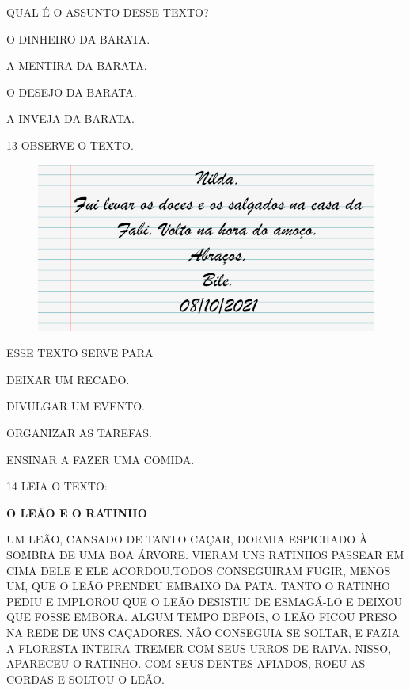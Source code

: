 QUAL É O ASSUNTO DESSE TEXTO?

\begin{multicols}{2}
\begin{escolha}
\item O DINHEIRO DA BARATA.

\item A MENTIRA DA BARATA.

\item O DESEJO DA BARATA.

\item A INVEJA DA BARATA.
\end{escolha}
\end{multicols}

\num{13} OBSERVE O TEXTO.

\begin{figure}[htpb]
\centering
\includegraphics[width=\textwidth]{media/image220.png}
\end{figure}

ESSE TEXTO SERVE PARA

\begin{escolha}
\item DEIXAR UM RECADO.

\item DIVULGAR UM EVENTO.

\item ORGANIZAR AS TAREFAS.

\item ENSINAR A FAZER UMA COMIDA.
\end{escolha}

\num{14} LEIA O TEXTO:

\begin{myquote}
\textbf{O LEÃO E O RATINHO}


UM LEÃO, CANSADO DE TANTO CAÇAR, DORMIA ESPICHADO À SOMBRA
DE UMA BOA ÁRVORE. VIERAM UNS RATINHOS PASSEAR EM CIMA DELE
E ELE ACORDOU.TODOS CONSEGUIRAM FUGIR, MENOS UM, QUE O LEÃO
PRENDEU EMBAIXO DA PATA. TANTO O RATINHO PEDIU E IMPLOROU
QUE O LEÃO DESISTIU DE ESMAGÁ-LO E DEIXOU QUE FOSSE EMBORA.
ALGUM TEMPO DEPOIS, O LEÃO FICOU PRESO NA REDE DE
UNS CAÇADORES. NÃO CONSEGUIA SE SOLTAR, E FAZIA A FLORESTA
INTEIRA TREMER COM SEUS URROS DE RAIVA.
NISSO, APARECEU O RATINHO. COM SEUS DENTES AFIADOS,
ROEU AS CORDAS E SOLTOU O LEÃO.

\end{myquote}

